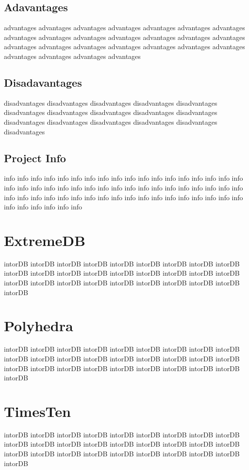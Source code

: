			\subsection{Adavantages}
			advantages advantages advantages advantages advantages 
			advantages advantages advantages advantages advantages 
			advantages advantages advantages advantages advantages 
			advantages advantages advantages advantages advantages 
			advantages advantages advantages advantages advantages 
			
			\subsection{Disadavantages}
			disadvantages disadvantages disadvantages disadvantages 
			disadvantages disadvantages disadvantages disadvantages 
			disadvantages disadvantages disadvantages disadvantages 
			disadvantages disadvantages disadvantages disadvantages 
			
			\subsection{Project Info}
			info info info info info info info info info info info info 
			info info info info info info info info info info info info 
			info info info info info info info info info info info info 
			info info info info info info info info info info info info 
			info info info info info info info info info info info info
		
		\section{ExtremeDB}
		intorDB intorDB intorDB intorDB intorDB intorDB intorDB 
		intorDB intorDB intorDB intorDB intorDB intorDB intorDB 
		intorDB intorDB intorDB intorDB intorDB intorDB intorDB 
		intorDB intorDB intorDB intorDB intorDB intorDB intorDB 
		
		\section{Polyhedra}
		intorDB intorDB intorDB intorDB intorDB intorDB intorDB 
		intorDB intorDB intorDB intorDB intorDB intorDB intorDB 
		intorDB intorDB intorDB intorDB intorDB intorDB intorDB 
		intorDB intorDB intorDB intorDB intorDB intorDB intorDB 
		
		\section{TimesTen}
		intorDB intorDB intorDB intorDB intorDB intorDB intorDB 
		intorDB intorDB intorDB intorDB intorDB intorDB intorDB 
		intorDB intorDB intorDB intorDB intorDB intorDB intorDB 
		intorDB intorDB intorDB intorDB intorDB intorDB intorDB 
		
